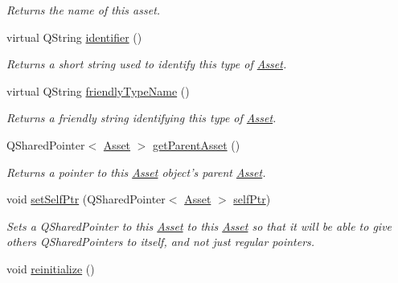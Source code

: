 \begin{DoxyCompactItemize}
\begin{DoxyCompactList}\small\item\em Returns the name of this asset. \end{DoxyCompactList}\item 
virtual Q\-String \hyperlink{class_picto_1_1_asset_a8d53229beb63862c36858e633dced712}{identifier} ()
\begin{DoxyCompactList}\small\item\em Returns a short string used to identify this type of \hyperlink{class_picto_1_1_asset}{Asset}. \end{DoxyCompactList}\item 
virtual Q\-String \hyperlink{class_picto_1_1_asset_a40eaa30ef5b2888d2a72a89bcf334c5f}{friendly\-Type\-Name} ()
\begin{DoxyCompactList}\small\item\em Returns a friendly string identifying this type of \hyperlink{class_picto_1_1_asset}{Asset}. \end{DoxyCompactList}\item 
Q\-Shared\-Pointer$<$ \hyperlink{class_picto_1_1_asset}{Asset} $>$ \hyperlink{class_picto_1_1_asset_addb1a1f161ef3640c206c4d568a41716}{get\-Parent\-Asset} ()
\begin{DoxyCompactList}\small\item\em Returns a pointer to this \hyperlink{class_picto_1_1_asset}{Asset} object's parent \hyperlink{class_picto_1_1_asset}{Asset}. \end{DoxyCompactList}\item 
void \hyperlink{class_picto_1_1_asset_aa0e64136d6a51d342a55cd56a8bacd24}{set\-Self\-Ptr} (Q\-Shared\-Pointer$<$ \hyperlink{class_picto_1_1_asset}{Asset} $>$ \hyperlink{class_picto_1_1_asset_ac6727fc4ef394103880e570c4b40d091}{self\-Ptr})
\begin{DoxyCompactList}\small\item\em Sets a Q\-Shared\-Pointer to this \hyperlink{class_picto_1_1_asset}{Asset} to this \hyperlink{class_picto_1_1_asset}{Asset} so that it will be able to give others Q\-Shared\-Pointers to itself, and not just regular pointers. \end{DoxyCompactList}\item 
\hypertarget{class_picto_1_1_asset_a58f9e828e755d32d2a32918b0adeb76b}{void \hyperlink{class_picto_1_1_asset_a58f9e828e755d32d2a32918b0adeb76b}{reinitialize} ()}\label{class_picto_1_1_asset_a58f9e828e755d32d2a32918b0adeb76b}


\end{DoxyCompactItemize}
